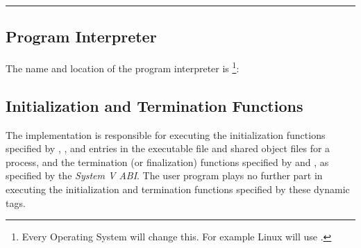 \bigskip\hrule

\subsection{Program Interpreter}

The name and location of the program interpreter  is%
\footnote{Every Operating System will change this.
  For example Linux will use .}:

\bigskip
{}

\subsection{Initialization and Termination Functions}

The implementation is responsible for executing the initialization
functions specified by ,  , and
 entries in the executable file and shared
object files for a process, and the termination (or finalization)
functions specified by  and , as
specified by the \textit{System V ABI}.  The user program plays no
further part in executing the initialization and termination functions
specified by these dynamic tags.



